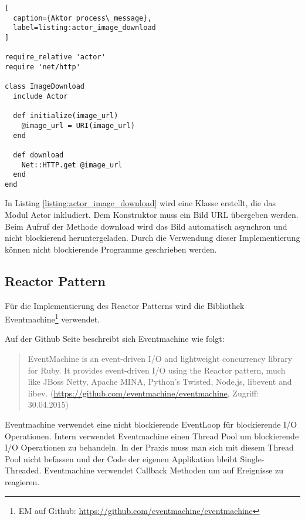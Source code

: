 \begin{lstlisting}[
  caption={Aktor process\_message},
  label=listing:actor_image_download
]

require_relative 'actor'
require 'net/http'

class ImageDownload
  include Actor

  def initialize(image_url)
    @image_url = URI(image_url)
  end

  def download
    Net::HTTP.get @image_url
  end
end
\end{lstlisting}

In Listing \ref{listing:actor_image_download} wird eine Klasse erstellt, die das Modul Actor inkludiert. Dem Konstruktor muss ein Bild URL übergeben werden. Beim Aufruf der Methode download wird das Bild automatisch asynchron und nicht blockierend heruntergeladen. Durch die Verwendung dieser Implementierung können nicht blockierende Programme geschrieben werden. 

\subsection{Reactor Pattern}
Für die Implementierung des Reactor Patterns wird die Bibliothek Eventmachine\footnote{EM auf Github: \url{https://github.com/eventmachine/eventmachine}} verwendet. 

Auf der Github Seite beschreibt sich Eventmachine wie folgt: 

\begin{quote}
  EventMachine is an event-driven I/O and lightweight concurrency library for Ruby. It provides event-driven I/O using the Reactor pattern, much like JBoss Netty, Apache MINA, Python's Twisted, Node.js, libevent and libev. (\url{https://github.com/eventmachine/eventmachine}, Zugriff: 30.04.2015)
\end{quote}

Eventmachine verwendet eine nicht blockierende EventLoop für blockierende I/O Operationen. Intern verwendet Eventmachine einen Thread Pool um blockierende I/O Operationen zu behandeln. In der Praxis muss man sich mit diesem Thread Pool nicht befassen und der Code der eigenen Applikation bleibt Single-Threaded. Eventmachine verwendet Callback Methoden um auf Ereignisse zu reagieren. 

